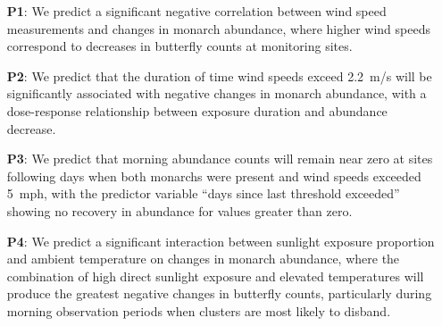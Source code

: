 \begin{enumerate}
    \item[\textbf{P1}:] We predict a significant negative correlation between wind speed measurements and changes in monarch abundance, where higher wind speeds correspond to decreases in butterfly counts at monitoring sites.
    \item[\textbf{P2}:] We predict that the duration of time wind speeds exceed 2.2~m/s will be significantly associated with negative changes in monarch abundance, with a dose-response relationship between exposure duration and abundance decrease.
    \item[\textbf{P3}:] We predict that morning abundance counts will remain near zero at sites following days when both monarchs were present and wind speeds exceeded 5~mph, with the predictor variable ``days since last threshold exceeded'' showing no recovery in abundance for values greater than zero.
    \item[\textbf{P4}:] We predict a significant interaction between sunlight exposure proportion and ambient temperature on changes in monarch abundance, where the combination of high direct sunlight exposure and elevated temperatures will produce the greatest negative changes in butterfly counts, particularly during morning observation periods when clusters are most likely to disband.
\end{enumerate}